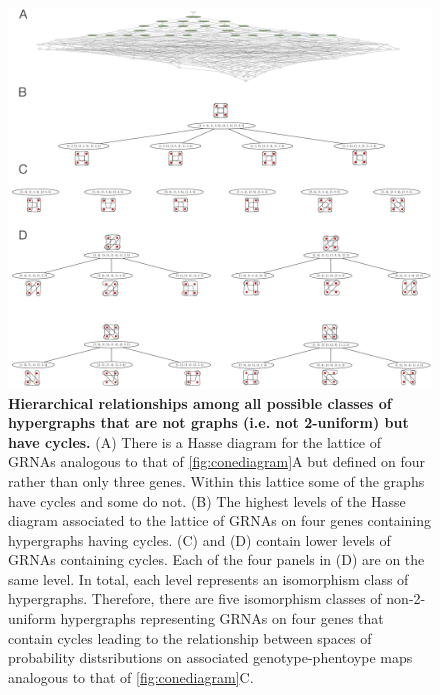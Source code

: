 \begin{figure}[!ht]
\centering
\noindent\includegraphics[width=1.0\columnwidth]{fig/non2uniformcyclichypergraphhasse.pdf}
\caption{{\bf Hierarchical relationships among all possible classes of hypergraphs that are not graphs (i.e. not 2-uniform) but have cycles.} (A) There is a Hasse diagram for the lattice of GRNAs analogous to that of \ref{fig:conediagram}A but defined on four rather than only three genes. Within this lattice some of the graphs have cycles and some do not. (B) The highest levels of the Hasse diagram associated to the lattice of GRNAs on four genes containing hypergraphs having cycles. (C) and (D) contain lower levels of GRNAs containing cycles. Each of the four panels in (D) are on the same level. In total, each level represents an isomorphism class of hypergraphs. Therefore, there are five isomorphism classes of non-2-uniform hypergraphs representing GRNAs on four genes that contain cycles leading to the relationship between spaces of probability distsributions on associated genotype-phentoype maps analogous to that of \ref{fig:conediagram}C.}
\label{fig:non2uniformcyclichypergraphhasse}
\end{figure}

